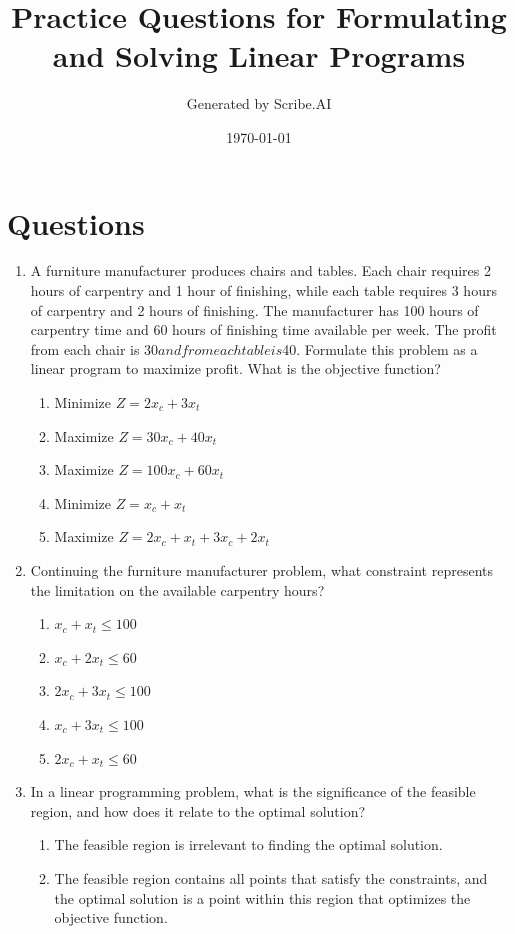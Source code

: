 \documentclass{article}%
\title{Practice Questions for Formulating and Solving Linear Programs}%
\author{Generated by Scribe.AI}%
\date{\today}%
\begin{document}
%
\normalsize%
\maketitle%
\section{Questions}%
\label{sec:Questions}%
\begin{enumerate}%
\item A furniture manufacturer produces chairs and tables. Each chair requires 2 hours of carpentry and 1 hour of finishing, while each table requires 3 hours of carpentry and 2 hours of finishing. The manufacturer has 100 hours of carpentry time and 60 hours of finishing time available per week.  The profit from each chair is $30 and from each table is $40. Formulate this problem as a linear program to maximize profit. What is the objective function?%
\begin{enumerate}%
\item Minimize $Z = 2x_c + 3x_t$%
\item Maximize $Z = 30x_c + 40x_t$%
\item Maximize $Z = 100x_c + 60x_t$%
\item Minimize $Z = x_c + x_t$%
\item Maximize $Z = 2x_c + x_t + 3x_c + 2x_t$%
\end{enumerate}%
\vspace{1em}%
\item Continuing the furniture manufacturer problem, what constraint represents the limitation on the available carpentry hours?%
\begin{enumerate}%
\item $x_c + x_t \le 100$%
\item $x_c + 2x_t \le 60$%
\item $2x_c + 3x_t \le 100$%
\item $x_c + 3x_t \le 100$%
\item $2x_c + x_t \le 60$%
\end{enumerate}%
\vspace{1em}%
\item In a linear programming problem, what is the significance of the feasible region, and how does it relate to the optimal solution?%
\begin{enumerate}%
\item The feasible region is irrelevant to finding the optimal solution.%
\item The feasible region contains all points that satisfy the constraints, and the optimal solution is a point within this region that optimizes the objective function.%

\end{enumerate}
\end{enumerate}
\end{document}
